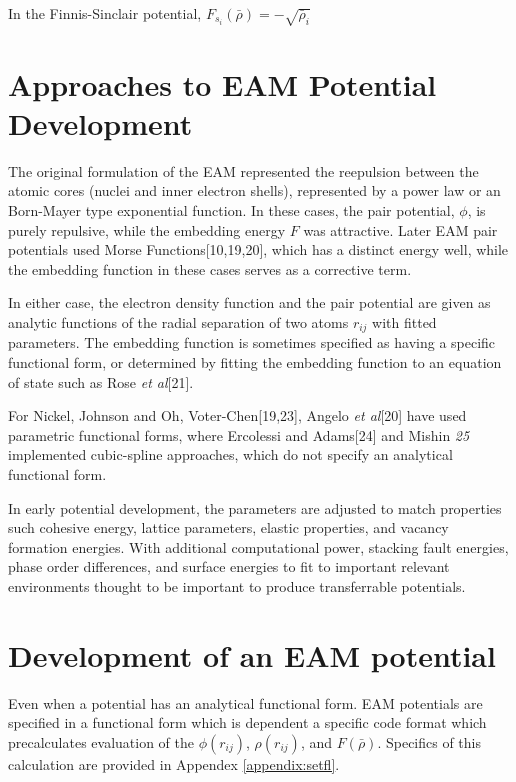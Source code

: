 In the Finnis-Sinclair potential, $F_{s_i}(\bar{\rho})=-\sqrt{\bar{\rho}_i}$

\section{Approaches to EAM Potential Development}

The original formulation of the EAM represented the reepulsion between the atomic cores (nuclei and inner electron shells), represented by a power law or an Born-Mayer type exponential function.  In these cases, the pair potential, $\phi$, is purely repulsive, while the embedding energy $F$ was attractive.
Later EAM pair potentials used Morse Functions[10,19,20], which has a distinct energy well, while the embedding function in these cases serves as a corrective term.

In either case, the electron density function and the pair potential are given as analytic functions of the radial separation of two atoms $r_{ij}$ with fitted parameters.  The embedding function is sometimes specified as having a specific functional form, or determined by fitting the embedding function to an equation of state such as Rose \emph{et al}[21].

For Nickel, Johnson and Oh\cite{johnson1989_eam_embedded_bjs}, Voter-Chen[19,23], Angelo \emph{et al}[20] have used parametric functional forms, where Ercolessi and Adams[24] and Mishin \emph{25} implemented cubic-spline approaches, which do not specify an analytical functional form.

In early potential development, the parameters are adjusted to match properties such cohesive energy, lattice parameters, elastic properties, and vacancy formation energies.  With additional computational power, stacking fault energies, phase order differences, and surface energies to fit to important relevant environments thought to be important to produce transferrable potentials.

\section{Development of an EAM potential}

Even when a potential has an analytical functional form. EAM potentials are specified in a functional form which is dependent a specific code format which precalculates evaluation of the $\phi(r_{ij})$, $\rho(r_{ij})$, and $F(\bar{\rho})$.  Specifics of this calculation are provided in Appendex \ref{appendix:setfl}.

